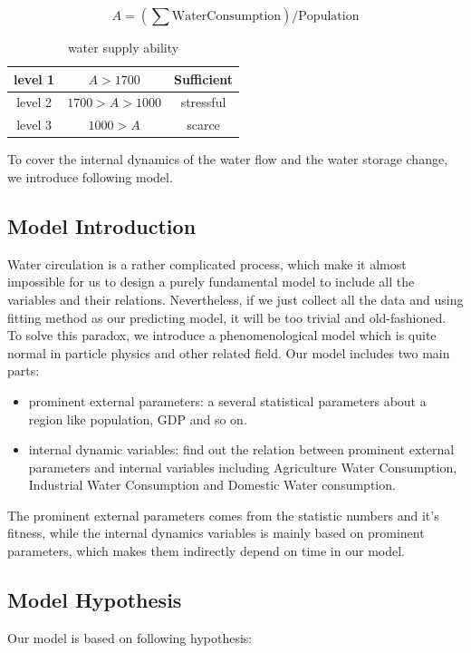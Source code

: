   \begin{equation}
  A = \left(\sum{\text{WaterConsumption}}\right)/\text{Population}
  \label{equ: Ability}
  \end{equation}


  \begin{table}[!htb]
    \centering
    \begin{tabular}{|c||c|c|}
    \hline
    level 1   & $A>1700$ & Sufficient \\
    \hline
    level 2   & $1700>A>1000$ & stressful \\
    \hline
    level 3   & $1000>A$ & scarce \\
    \hline
    \end{tabular}
    \caption{water supply ability}
    \label{tab: water supply ability}
  \end{table}

To cover the internal dynamics of the water flow and the water storage change, we introduce following model.

  \subsection{Model Introduction}
    Water circulation is a rather complicated process, which make it almost impossible for us to design a purely fundamental model to include all the variables and their relations. Nevertheless, if we just collect all the data and using fitting method as our predicting model, it will be too trivial and old-fashioned. To solve this paradox, we introduce a phenomenological model which is quite normal in particle physics and other related field. Our model includes two main parts:
    \begin{itemize}
      \item prominent external parameters: a several statistical parameters about a region like population, GDP and so on.
      \item internal dynamic variables: find out the relation between prominent external parameters and internal variables including Agriculture Water Consumption, Industrial Water Consumption and Domestic Water consumption.
    \end{itemize}
    The prominent external parameters comes from the statistic numbers and it's fitness, while the internal dynamics variables is mainly based on prominent parameters, which makes them indirectly depend on time in our model.

  \subsection{Model Hypothesis}
    Our model is based on following hypothesis:

